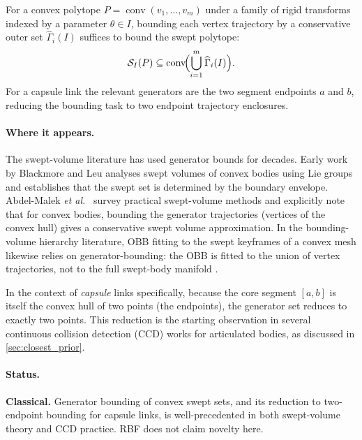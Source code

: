 \documentclass[11pt,a4paper]{article}
\newcommand{\etal}{\textit{et al.}}
\begin{document}
For a convex polytope $P = \operatorname{conv}(v_1,\dots,v_m)$ under a family
of rigid transforms indexed by a parameter $\theta \in I$, bounding each
vertex trajectory by a conservative outer set $\widehat{\Gamma}_i(I)$ suffices
to bound the swept polytope:
\begin{equation}
  \mathcal{S}_I(P)
  \subseteq
  \operatorname{conv}\!\Bigl(\bigcup_{i=1}^{m} \widehat{\Gamma}_i(I)\Bigr).
  \label{eq:generator_bound}
\end{equation}
For a capsule link the relevant generators are the two segment endpoints $a$
and $b$, reducing the bounding task to two endpoint trajectory enclosures.

\paragraph{Where it appears.}
The swept-volume literature has used generator bounds for decades.  Early work
by Blackmore and Leu \cite{blackmore1992swept} analyses swept volumes of
convex bodies using Lie groups and establishes that the swept set is
determined by the boundary envelope.  Abdel-Malek \etal\
\cite{abdel2004swept} survey practical swept-volume methods and explicitly note
that for convex bodies, bounding the generator trajectories (vertices of the
convex hull) gives a conservative swept volume approximation.  In the
bounding-volume hierarchy literature, OBB fitting to the swept keyframes of a
convex mesh likewise relies on generator-bounding: the OBB is fitted to the
union of vertex trajectories, not to the full swept-body
manifold \cite{gottschalk1996obbtree}.

In the context of \emph{capsule} links specifically, because the core segment
$[a,b]$ is itself the convex hull of two points (the endpoints), the generator
set reduces to exactly two points.  This reduction is the starting observation
in several continuous collision detection (CCD) works for articulated bodies,
as discussed in \cref{sec:closest_prior}.

\paragraph{Status.}
\textbf{Classical.}  Generator bounding of convex swept sets, and its
reduction to two-endpoint bounding for capsule links, is well-precedented in
both swept-volume theory and CCD practice.  RBF does not claim novelty here.

\end{document}
